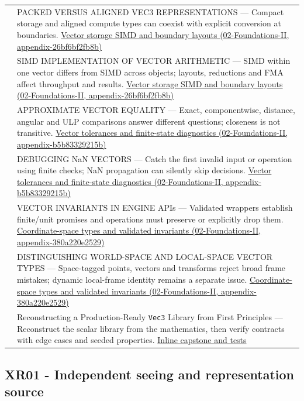 {\begin{longtable}[]{@{}
  >{\raggedright\arraybackslash}p{}
  >{\raggedright\arraybackslash}p{}@{}}
594 & PACKED VERSUS ALIGNED VEC3 REPRESENTATIONS --- Compact storage and aligned compute types can coexist with explicit conversion at boundaries. \href{}{Vector storage SIMD and boundary layouts (02-Foundations-II, appendix-26bf6bf2fb8b)} \\
595 & SIMD IMPLEMENTATION OF VECTOR ARITHMETIC --- SIMD within one vector differs from SIMD across objects; layouts, reductions and FMA affect throughput and results. \href{}{Vector storage SIMD and boundary layouts (02-Foundations-II, appendix-26bf6bf2fb8b)} \\
596 & APPROXIMATE VECTOR EQUALITY --- Exact, componentwise, distance, angular and ULP comparisons answer different questions; closeness is not transitive. \href{}{Vector tolerances and finite-state diagnostics (02-Foundations-II, appendix-b5b83329215b)} \\
597 & DEBUGGING NaN VECTORS --- Catch the first invalid input or operation using finite checks; NaN propagation can silently skip decisions. \href{}{Vector tolerances and finite-state diagnostics (02-Foundations-II, appendix-b5b83329215b)} \\
598 & VECTOR INVARIANTS IN ENGINE APIs --- Validated wrappers establish finite/unit promises and operations must preserve or explicitly drop them. \href{}{Coordinate-space types and validated invariants (02-Foundations-II, appendix-380a220e2529)} \\
599 & DISTINGUISHING WORLD-SPACE AND LOCAL-SPACE VECTOR TYPES --- Space-tagged points, vectors and transforms reject broad frame mistakes; dynamic local-frame identity remains a separate issue. \href{}{Coordinate-space types and validated invariants (02-Foundations-II, appendix-380a220e2529)} \\
600 & Reconstructing a Production-Ready \texttt{Vec3} Library from First Principles --- Reconstruct the scalar library from the mathematics, then verify contracts with edge cases and seeded properties. \href{Continuous\%20Notes/Computing\%20Foundations\%20-\%20From\%20Bits\%20to\%20C++\%20and\%20Systems\%20APIs\#A\%20complete\%20scalar\%20laboratory\%20makes\%20the\%20story\%20executable/}{Inline capstone and tests} \\
\end{longtable}
}

\subsection{XR01 - Independent seeing and representation source}\label{xr01---independent-seeing-and-representation-source}


